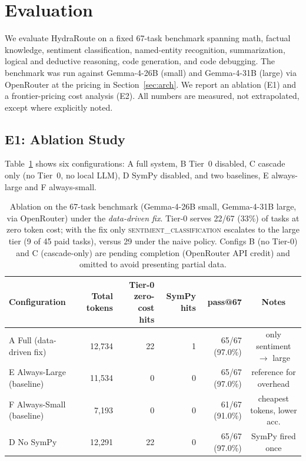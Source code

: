 \documentclass[11pt]{article}
\newcommand{\system}{HydraRoute\xspace}
\begin{document}
\section{Evaluation}
\label{sec:eval}

We evaluate \system on a fixed 67-task benchmark spanning math, factual knowledge, sentiment classification, named-entity recognition, summarization, logical and deductive reasoning, code generation, and code debugging. The benchmark was run against Gemma-4-26B (small) and Gemma-4-31B (large) via OpenRouter at the pricing in Section~\ref{sec:arch}. We report an ablation (E1) and a frontier-pricing cost analysis (E2). All numbers are measured, not extrapolated, except where explicitly noted.

\subsection{E1: Ablation Study}
\label{sec:ablation}

Table~\ref{tab:ablation} shows six configurations: \textsc{A} full system, \textsc{B} Tier~0 disabled, \textsc{C} cascade only (no Tier~0, no local LLM), \textsc{D} SymPy disabled, and two baselines, \textsc{E} always-large and \textsc{F} always-small.

\begin{table}[t]
\centering
\small
\begin{tabular}{@{}lrrrrc@{}}
\toprule
Configuration & Total tokens & Tier-0 zero-cost hits & SymPy hits & pass@67 & Notes \\
\midrule
\textsc{A} Full (data-driven fix) & 12,734 & 22 & 1 & 65/67 (97.0\%) & only sentiment $\to$ large \\
\textsc{E} Always-Large (baseline) & 11,534 & 0 & 0 & 65/67 (97.0\%) & reference for overhead \\
\textsc{F} Always-Small (baseline) & 7,193 & 0 & 0 & 61/67 (91.0\%) & cheapest tokens, lower acc. \\
\textsc{D} No SymPy & 12,291 & 22 & 0 & 65/67 (97.0\%) & SymPy fired once \\
\bottomrule
\end{tabular}
\caption{Ablation on the 67-task benchmark (Gemma-4-26B small, Gemma-4-31B large, via OpenRouter) under the \emph{data-driven fix}. Tier-0 serves 22/67 (33\%) of tasks at zero token cost; with the fix only \textsc{sentiment\_classification} escalates to the large tier (9 of 45 paid tasks), versus 29 under the naive policy. Configs \textsc{B} (no Tier-0) and \textsc{C} (cascade-only) are pending completion (OpenRouter API credit) and omitted to avoid presenting partial data.}
\label{tab:ablation}
\end{table}
\end{document}
